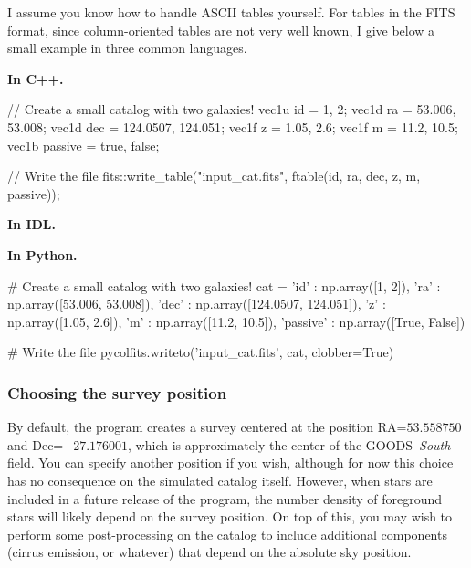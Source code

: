 I assume you know how to handle ASCII tables yourself. For tables in the FITS format, since column-oriented tables are not very well known, I give below a small example in three common languages.

{\bf In C++.}
\begin{cppcode}
// Create a small catalog with two galaxies!
vec1u id      = {1,        2};
vec1d ra      = {53.006,   53.008};
vec1d dec     = {124.0507, 124.051};
vec1f z       = {1.05,     2.6};
vec1f m       = {11.2,     10.5};
vec1b passive = {true,     false};

// Write the file
fits::write_table("input_cat.fits", ftable(id, ra, dec, z, m, passive));
\end{cppcode}

{\bf In IDL.}

{\bf In Python.}
\begin{pythoncode}
# Create a small catalog with two galaxies!
cat = {
    'id'      : np.array([1,        2]),
    'ra'      : np.array([53.006,   53.008]),
    'dec'     : np.array([124.0507, 124.051]),
    'z'       : np.array([1.05,     2.6]),
    'm'       : np.array([11.2,     10.5]),
    'passive' : np.array([True,     False])
}

# Write the file
pycolfits.writeto('input_cat.fits', cat, clobber=True)
\end{pythoncode}


\subsubsection{Choosing the survey position}

By default, the program creates a survey centered at the position RA=$53.558750$ and Dec=$-27.176001$, which is approximately the center of the GOODS--{\it South} field. You can specify another position if you wish, although for now this choice has no consequence on the simulated catalog itself. However, when stars are included in a future release of the program, the number density of foreground stars will likely depend on the survey position. On top of this, you may wish to perform some post-processing on the catalog to include additional components (cirrus emission, or whatever) that depend on the absolute sky position.

